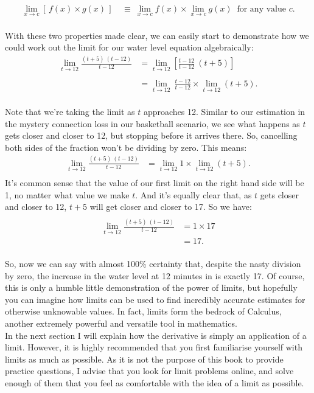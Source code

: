 \documentclass[11pt]{article}
\numberwithin{equation}{section}
\begin{document}
\begin{align*}
\lim_{x \to c} \left[ \, f(x) \times g(x) \, \right] \ &\equiv \ \lim_{x \to c} f(x) \times \lim_{x \to c} g(x) \ \textrm{ for any value } c.
\end{align*}
\\ With these two properties made clear, we can easily start to demonstrate how we could work out the limit for our water level equation algebraically:
\begin{align*}
\lim_{t \to 12} \frac{(t + 5) \ (t - 12)}{t - 12} &= \lim_{t \to 12} \left[ \frac{t - 12}{t - 12} \ (t + 5) \right] \\ \\
 &= \lim_{t \to 12} \ \frac{t - 12}{t - 12} \times \lim_{t \to 12} (t + 5).
\end{align*}
\\ Note that we're taking the limit as \(t\) approaches 12. Similar to our estimation in the mystery connection loss in our basketball scenario, we see what happens as \(t\) gets closer and closer to 12, but stopping before it arrives there. So, cancelling both sides of the fraction won't be dividing by zero. This means:
\begin{align*}
\lim_{t \to 12} \frac{(t + 5) \ (t - 12)}{t - 12} &= \lim_{t \to 12} 1 \times \lim_{t \to 12} \left( t + 5 \right). \\
\end{align*}
It's common sense that the value of our first limit on the right hand side will be 1, no matter what value we make \(t\). And it's equally clear that, as \(t\) gets closer and closer to 12, \(t + 5\) will get closer and closer to 17. So we have:
\begin{align*}
\\
\lim_{t \to 12} \frac{(t + 5) \ (t - 12)}{t - 12} &= 1 \times 17 \\
&= 17.
\end{align*}
\\ So, now we can say with almost 100\% certainty that, despite the nasty division by zero, the increase in the water level at 12 minutes in is exactly 17. Of course, this is only a humble little demonstration of the power of limits, but hopefully you can imagine how limits can be used to find incredibly accurate estimates for otherwise unknowable values. In fact, limits form the bedrock of Calculus, another extremely powerful and versatile tool in mathematics. 
\\ In the next section I will explain how the derivative is simply an application of a limit. However, it is highly recommended that you first familiarise yourself with limits as much as possible. As it is not the purpose of this book to provide practice questions, I advise that you look for limit problems online, and solve enough of them that you feel as comfortable with the idea of a limit as possible. 
\end{document}
